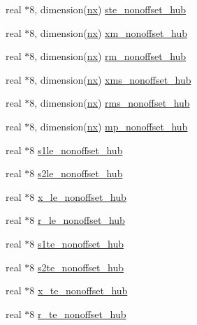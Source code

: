 \begin{DoxyCompactItemize}
\item 
real $\ast$8, dimension(\hyperlink{namespaceglobvar_ae4d2e4d1bd4180999afe29337165e1e6}{nx}) \hyperlink{namespaceglobvar_a06fc43eda669fded7f4d926b2c06d517}{ste\+\_\+nonoffset\+\_\+hub}
\item 
real $\ast$8, dimension(\hyperlink{namespaceglobvar_ae4d2e4d1bd4180999afe29337165e1e6}{nx}) \hyperlink{namespaceglobvar_a43680257555ebbaba3cd4de3408e11cf}{xm\+\_\+nonoffset\+\_\+hub}
\item 
real $\ast$8, dimension(\hyperlink{namespaceglobvar_ae4d2e4d1bd4180999afe29337165e1e6}{nx}) \hyperlink{namespaceglobvar_a95b82ec95a1e3b3f2b9bbd53364a6fdc}{rm\+\_\+nonoffset\+\_\+hub}
\item 
real $\ast$8, dimension(\hyperlink{namespaceglobvar_ae4d2e4d1bd4180999afe29337165e1e6}{nx}) \hyperlink{namespaceglobvar_a4fce94b892f139d05a7972fbea0d4a8c}{xms\+\_\+nonoffset\+\_\+hub}
\item 
real $\ast$8, dimension(\hyperlink{namespaceglobvar_ae4d2e4d1bd4180999afe29337165e1e6}{nx}) \hyperlink{namespaceglobvar_a598d438487e1d0e98107a657635f77b7}{rms\+\_\+nonoffset\+\_\+hub}
\item 
real $\ast$8, dimension(\hyperlink{namespaceglobvar_ae4d2e4d1bd4180999afe29337165e1e6}{nx}) \hyperlink{namespaceglobvar_a9cc33a73476cd269f28f4637663baa64}{mp\+\_\+nonoffset\+\_\+hub}
\item 
real $\ast$8 \hyperlink{namespaceglobvar_ad09cdd70dbe671871fe37e6f4784fc13}{s1le\+\_\+nonoffset\+\_\+hub}
\item 
real $\ast$8 \hyperlink{namespaceglobvar_a8eb69430dd19178f5b03bdb675e37743}{s2le\+\_\+nonoffset\+\_\+hub}
\item 
real $\ast$8 \hyperlink{namespaceglobvar_a56eebc89ec38db33a07e5123a3ebee11}{x\+\_\+le\+\_\+nonoffset\+\_\+hub}
\item 
real $\ast$8 \hyperlink{namespaceglobvar_aa647142f05c00b609672eb515f611e3a}{r\+\_\+le\+\_\+nonoffset\+\_\+hub}
\item 
real $\ast$8 \hyperlink{namespaceglobvar_af297468b9676c6972847e41f78de2d25}{s1te\+\_\+nonoffset\+\_\+hub}
\item 
real $\ast$8 \hyperlink{namespaceglobvar_a339922829843baa5c9b7602f44111b2a}{s2te\+\_\+nonoffset\+\_\+hub}
\item 
real $\ast$8 \hyperlink{namespaceglobvar_abbf81b644dde8fac9df2a6f46bfb1709}{x\+\_\+te\+\_\+nonoffset\+\_\+hub}
\item 
real $\ast$8 \hyperlink{namespaceglobvar_a2a458742e93da2e7da417d4e0e787cc1}{r\+\_\+te\+\_\+nonoffset\+\_\+hub}

\end{DoxyCompactItemize}
